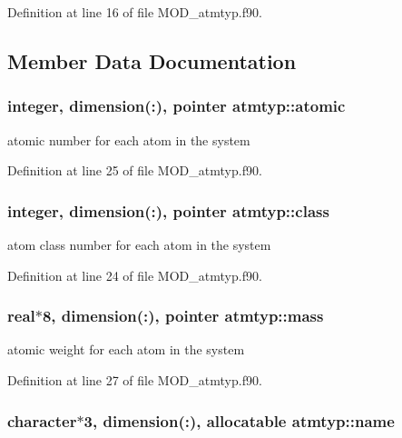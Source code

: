 Definition at line 16 of file M\-O\-D\-\_\-atmtyp.\-f90.



\subsection{Member Data Documentation}
\hypertarget{classatmtyp_ab316f0521d8d32f8cb3a66233aa75f16}{
\subsubsection[{atomic}]{\setlength{\rightskip}{0pt plus 5cm}integer, dimension(\-:), pointer atmtyp\-::atomic}}\label{classatmtyp_ab316f0521d8d32f8cb3a66233aa75f16}


atomic number for each atom in the system 



Definition at line 25 of file M\-O\-D\-\_\-atmtyp.\-f90.

\hypertarget{classatmtyp_a48303b334c626a3533cdb171193bce65}{
\subsubsection[{class}]{\setlength{\rightskip}{0pt plus 5cm}integer, dimension(\-:), pointer atmtyp\-::class}}\label{classatmtyp_a48303b334c626a3533cdb171193bce65}


atom class number for each atom in the system 



Definition at line 24 of file M\-O\-D\-\_\-atmtyp.\-f90.

\hypertarget{classatmtyp_a38f28acf1bb80d2b494b2dd1228cf6e7}{
\subsubsection[{mass}]{\setlength{\rightskip}{0pt plus 5cm}real$\ast$8, dimension(\-:), pointer atmtyp\-::mass}}\label{classatmtyp_a38f28acf1bb80d2b494b2dd1228cf6e7}


atomic weight for each atom in the system 



Definition at line 27 of file M\-O\-D\-\_\-atmtyp.\-f90.

\hypertarget{classatmtyp_a80d3ce7bde3a35105e7ca5ae45114a57}{
\subsubsection[{name}]{\setlength{\rightskip}{0pt plus 5cm}character$\ast$3, dimension(\-:), allocatable atmtyp\-::name}}\label{classatmtyp_a80d3ce7bde3a35105e7ca5ae45114a57}



